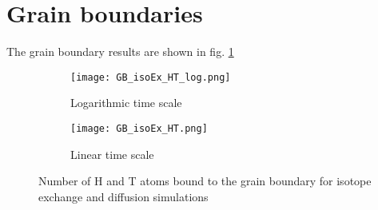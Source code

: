 \section{Grain boundaries}
The grain boundary results are shown in fig. \ref{Fig:GB_results}

\begin{figure}[ht]
\begin{subfigure}{.5\textwidth}
  \centering
 \texttt{[image: GB\_isoEx\_HT\_log.png]}  
  \caption{Logarithmic time scale}
\end{subfigure}
\begin{subfigure}{.5\textwidth}
  \centering
  \texttt{[image: GB\_isoEx\_HT.png]}  
  \caption{Linear time scale}
\end{subfigure}
   \caption{Number of H and T atoms bound to the grain boundary for isotope exchange and diffusion simulations}
   \label{Fig:GB_results} 
\end{figure}

